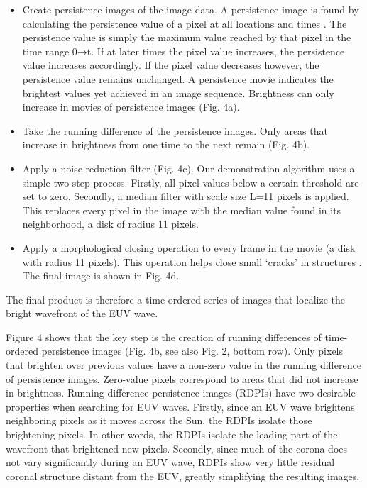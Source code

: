 \begin{itemize}
\item Create persistence images of the image data.  A persistence image is found by calculating the persistence value of a pixel at all locations and times \citep[e.g.][]{2014AAS...22421838T}.  The persistence value is simply the maximum value reached by that pixel in the time range 0→t.  If at later times the pixel value increases, the persistence value increases accordingly. If the pixel value decreases however, the persistence value remains unchanged. A persistence movie indicates the brightest values yet achieved in an image sequence.  Brightness can only increase in movies of persistence images (Fig. 4a). 


\item Take the running difference of the persistence images. Only areas that increase in brightness from one time to the next remain (Fig. 4b).

\item Apply a noise reduction filter (Fig. 4c).  Our demonstration algorithm uses a simple two step process.  Firstly, all pixel values below a certain threshold are set to zero.  Secondly, a median filter with scale size L=11 pixels is applied.  This replaces every pixel in the image with the median value found in its neighborhood, a disk of radius 11 pixels.

\item Apply a morphological closing \citep{2002dip..book.....G} operation to every frame in the movie (a disk with radius 11 pixels).  This operation helps close small ‘cracks’ in structures \citep{2002dip..book.....G}.  The final image is shown in Fig. 4d.
\end{itemize}

The final product is therefore a time-ordered series of images that localize the bright wavefront of the EUV wave.




Figure 4 shows that the key step is the creation of running differences of time-ordered persistence images (Fig. 4b, see also Fig. 2, bottom row).  Only pixels that brighten over previous values have a non-zero value in the running difference of persistence images.  Zero-value pixels correspond to areas that did not increase in brightness.  Running difference persistence images (RDPIs) have two desirable properties when searching for EUV waves.  Firstly, since an EUV wave brightens neighboring pixels as it moves across the Sun, the RDPIs isolate those brightening pixels.  In other words, the RDPIs isolate the leading part of the wavefront that brightened new pixels.  Secondly, since much of the corona does not vary significantly during an EUV wave, RDPIs show very little residual coronal structure distant from the EUV, greatly simplifying the resulting images.  

